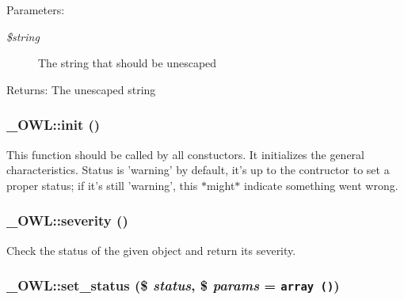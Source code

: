 \begin{Desc}
\item[Parameters:]
\begin{description}
\item[{\em \$string}]The string that should be unescaped \end{description}
\end{Desc}
\begin{Desc}
\item[Returns:]The unescaped string \end{Desc}
\hypertarget{class__OWL_e0ef3ded56e8a6b34b6461e5a721cd3e}{
\subsubsection{\setlength{\rightskip}{0pt plus 5cm}\_\-OWL::init ()}}
\label{class__OWL_e0ef3ded56e8a6b34b6461e5a721cd3e}


This function should be called by all constuctors. It initializes the general characteristics. Status is 'warning' by default, it's up to the contructor to set a proper status; if it's still 'warning', this $\ast$might$\ast$ indicate something went wrong. \hypertarget{class__OWL_5b88d497ccf2305fa411b9bd3f4bfe6f}{
\subsubsection{\setlength{\rightskip}{0pt plus 5cm}\_\-OWL::severity ()}}
\label{class__OWL_5b88d497ccf2305fa411b9bd3f4bfe6f}


Check the status of the given object and return its severity. \hypertarget{class__OWL_ea912d0ede9b3c2a69b79072d94d4787}{
\subsubsection{\setlength{\rightskip}{0pt plus 5cm}\_\-OWL::set\_\-status (\$ {\em status}, \$ {\em params} = {\tt array~()})}}
\label{class__OWL_ea912d0ede9b3c2a69b79072d94d4787}


